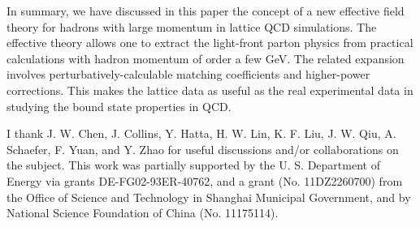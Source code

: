 \documentclass[aps,prd,preprint,tightenlines,superscriptaddress]{revtex4}
\begin{document}
In summary, we have discussed in this paper the concept of a new effective field theory
for hadrons with large momentum in lattice QCD simulations. The effective theory allows one
to extract the light-front parton physics from practical calculations with hadron momentum 
of order a few GeV. The related expansion involves perturbatively-calculable matching coefficients
and higher-power corrections. This makes the lattice data as useful as the real experimental 
data in studying the bound state properties in QCD. 


I thank J. W. Chen, J. Collins, Y. Hatta, H. W. Lin, K. F. Liu, J. W. Qiu, A. Schaefer, F. Yuan, and Y. Zhao for useful
discussions and/or collaborations on the subject. This work was partially supported by the U.
S. Department of Energy via grants DE-FG02-93ER-40762, and a grant (No. 11DZ2260700) from the Office of
Science and Technology in Shanghai Municipal Government, and by National Science Foundation of China (No. 11175114).
\end{document}
